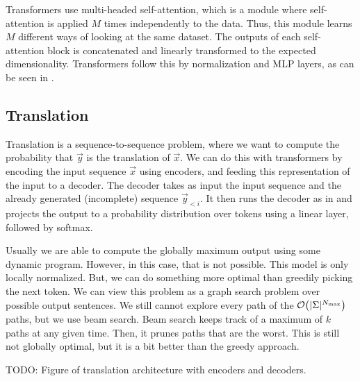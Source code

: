 Transformers \citep{vaswani2017attention} use multi-headed self-attention,
which is a module where self-attention is applied $M$ times independently to
the data. Thus, this module learns $M$ different ways of looking at the same
dataset. The outputs of each self-attention block is concatenated and linearly
transformed to the expected dimensionality. Transformers follow this by
normalization and MLP layers, as can be seen in .

\subsection{Translation}

Translation is a sequence-to-sequence problem, where we want to compute the
probability that $\vec{y}$ is the translation of $\vec{x}$. We can do this with
transformers by encoding the input sequence $\vec{x}$ using encoders, and
feeding this representation of the input to a decoder. The decoder takes as
input the input sequence and the already generated (incomplete) sequence
$\vec{y}_{<i}$. It then runs the decoder as in  and
projects the output to a probability distribution over tokens using a linear
layer, followed by softmax.

Usually we are able to compute the globally maximum output using some dynamic
program. However, in this case, that is not possible. This model is only
locally normalized. But, we can do something more optimal than greedily picking
the next token. We can view this problem as a graph search problem over
possible output sentences. We still cannot explore every path of the
$\bigo{|\Sigma|^{N_{\max}}}$ paths, but we use beam search. Beam search keeps
track of a maximum of $k$ paths at any given time. Then, it prunes paths that
are the worst. This is still not globally optimal, but it is a bit better than
the greedy approach.

TODO: Figure of translation architecture with encoders and decoders.
